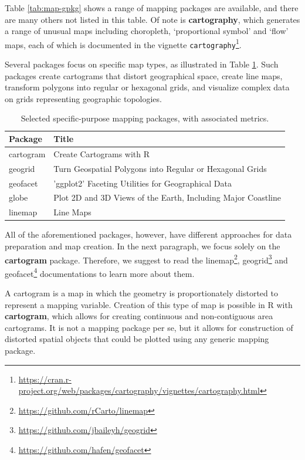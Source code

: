 \documentclass[]{krantz}
\let\rmarkdownfootnote\footnote%
\def\footnote{\protect\rmarkdownfootnote}
\renewcommand{\href}[2]{#2\footnote{\url{#1}}}
\begin{document}
Table \ref{tab:map-gpkg} shows a range of mapping packages are available, and there are many others not listed in this table.
Of note is \textbf{cartography}, which generates a range of unusual maps including choropleth, `proportional symbol' and `flow' maps, each of which is documented in the vignette \href{https://cran.r-project.org/web/packages/cartography/vignettes/cartography.html}{\texttt{cartography}}.

Several packages focus on specific map types, as illustrated in Table \ref{tab:map-spkg}.
Such packages create cartograms that distort geographical space, create line maps, transform polygons into regular or hexagonal grids, and visualize complex data on grids representing geographic topologies.

\begin{table}[t]

\caption[Selected specific-purpose mapping packages.]{\label{tab:map-spkg}Selected specific-purpose mapping packages, with associated metrics.}
\centering
\begin{tabular}{ll}
\toprule
Package & Title\\
\midrule
cartogram & Create Cartograms with R\\
geogrid & Turn Geospatial Polygons into Regular or Hexagonal Grids\\
geofacet & 'ggplot2' Faceting Utilities for Geographical Data\\
globe & Plot 2D and 3D Views of the Earth, Including Major Coastline\\
linemap & Line Maps\\
\bottomrule
\end{tabular}
\end{table}

All of the aforementioned packages, however, have different approaches for data preparation and map creation.
In the next paragraph, we focus solely on the \textbf{cartogram} package.
Therefore, we suggest to read the \href{https://github.com/rCarto/linemap}{linemap}, \href{https://github.com/jbaileyh/geogrid}{geogrid} and \href{https://github.com/hafen/geofacet}{geofacet} documentations to learn more about them.

A cartogram is a map in which the geometry is proportionately distorted to represent a mapping variable.
Creation of this type of map is possible in R with \textbf{cartogram}, which allows for creating continuous and non-contiguous area cartograms.
It is not a mapping package per se, but it allows for construction of distorted spatial objects that could be plotted using any generic mapping package.
\end{document}
